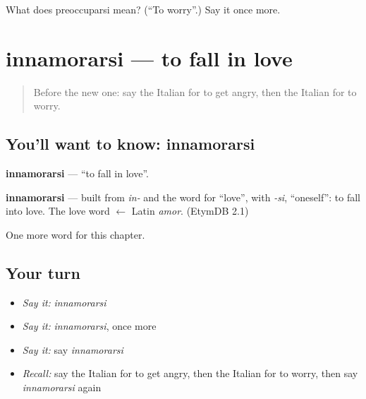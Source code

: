 \begin{tcolorbox}[breakable,colback=teal!4,colframe=teal!35!black,title={Before you move on}]
What does preoccuparsi mean? (\textquotedblleft{}To worry\textquotedblright{}.) Say it once more.
\end{tcolorbox}
\section[innamorarsi]{innamorarsi — to fall in love}

\label{lesson:IT-C144-innamorarsi}



\begin{quote}
Before the new one: say the Italian for to get angry, then the Italian for to worry.
\end{quote}

\subsection*{You'll want to know: innamorarsi}
\textbf{innamorarsi} — \textquotedblleft{}to fall in love\textquotedblright{}.

\begin{cousinweb}
\textbf{innamorarsi} — built from \emph{in-} and the word for \textquotedblleft{}love\textquotedblright{}, with \emph{-si}, \textquotedblleft{}oneself\textquotedblright{}: to fall into love. The love word $\leftarrow$ Latin \emph{amor}. (EtymDB 2.1)
\end{cousinweb}

\begin{grammarlens}[title={What you've built}]
One more word for this chapter.
\end{grammarlens}

\subsection*{Your turn}
\begin{itemize}
\raggedright
  \item \emph{Say it:} \emph{innamorarsi}
  \item \emph{Say it:} \emph{innamorarsi}, once more
  \item \emph{Say it:} say \emph{innamorarsi}
  \item \emph{Recall:} say the Italian for to get angry, then the Italian for to worry, then say \emph{innamorarsi} again
\end{itemize}

